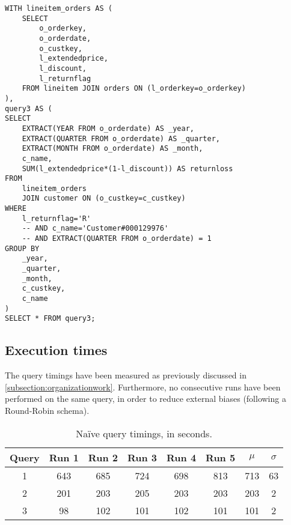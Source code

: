 \begin{lstlisting}
WITH lineitem_orders AS (
	SELECT 
		o_orderkey, 
		o_orderdate, 
		o_custkey, 
		l_extendedprice, 
		l_discount, 
		l_returnflag
	FROM lineitem JOIN orders ON (l_orderkey=o_orderkey)
),
query3 AS (
SELECT
	EXTRACT(YEAR FROM o_orderdate) AS _year,
	EXTRACT(QUARTER FROM o_orderdate) AS _quarter,
	EXTRACT(MONTH FROM o_orderdate) AS _month,
	c_name,
	SUM(l_extendedprice*(1-l_discount)) AS returnloss
FROM
	lineitem_orders
	JOIN customer ON (o_custkey=c_custkey)
WHERE 
	l_returnflag='R'
	-- AND c_name='Customer#000129976'
	-- AND EXTRACT(QUARTER FROM o_orderdate) = 1
GROUP BY
	_year,
	_quarter,
	_month,
	c_custkey,
	c_name
)
SELECT * FROM query3;
\end{lstlisting}

\subsection{Execution times}

The query timings have been measured as previously discussed in \autoref{subsection:organizationwork}.
Furthermore, no consecutive runs have been performed on the same query, in order to reduce external biases (following a Round-Robin schema).

\begin{table}[!h]
\centering
\begin{tabular}{|| c | c c c c c | c c ||} 
 \hline
 Query & Run 1 & Run 2 & Run 3 & Run 4 & Run 5 & 	$\mu$ & $\sigma$ \\ [0.5ex] 
 \hline\hline
 1 & 643 & 685 & 724 & 698 & 813 & 713 & 63 \\ 
 \hline
 2 & 201 & 203 & 205 & 203 & 203 & 203 & 2 \\
 \hline
 3 & 98 & 102 & 101 & 102 & 101 & 101 & 2 \\
 \hline
\end{tabular}
  \caption{Na\"{i}ve query timings, in seconds.}
  \label{tab:vanillatimings}
\end{table}